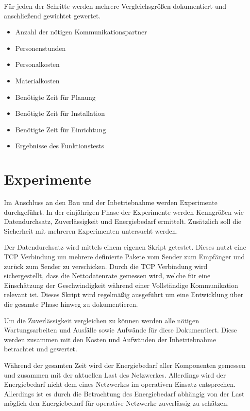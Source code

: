 Für jeden der Schritte werden mehrere Vergleichsgrößen dokumentiert und anschließend gewichtet gewertet.

\begin{itemize}
    \item Anzahl der nötigen Kommunikationspartner
    \item Personenstunden
    \item Personalkosten
    \item Materialkosten
    \item Benötigte Zeit für Planung
    \item Benötigte Zeit für Installation
    \item Benötigte Zeit für Einrichtung
    \item Ergebnisse des Funktionstests
\end{itemize}

\section{Experimente}

Im Anschluss an den Bau und der Inbetriebnahme werden Experimente durchgeführt.
In der einjährigen Phase der Experimente werden Kenngrößen wie Datendurchsatz, Zuverlässigkeit und Energiebedarf ermittelt.
Zusätzlich soll die Sicherheit mit mehreren Experimenten untersucht werden.

Der Datendurchsatz wird mittels einem eigenen Skript getestet.
Dieses nutzt eine \ac{TCP} Verbindung um mehrere definierte Pakete vom Sender zum Empfänger und zurück zum Sender zu verschicken.
Durch die \ac{TCP} Verbindung wird sichergestellt, dass die Nettodatenrate gemessen wird, welche für eine Einschätzung der Geschwindigkeit während einer Vollständige Kommunikation relevant ist.
Dieses Skript wird regelmäßig ausgeführt um eine Entwicklung über die gesamte Phase hinweg zu dokumentieren.

Um die Zuverlässigkeit vergleichen zu können werden alle nötigen Wartungsarbeiten und Ausfälle sowie Aufwände für diese Dokumentiert.
Diese werden zusammen mit den Kosten und Aufwänden der Inbetriebnahme betrachtet und gewertet.

Während der gesamten Zeit wird der Energiebedarf aller Komponenten gemessen und zusammen mit der aktuellen Last des Netzwerkes.
Allerdings wird der Energiebedarf nicht dem eines Netzwerkes im operativen Einsatz entsprechen.
Allerdings ist es durch die Betrachtung des Energiebedarf abhängig von der Last möglich den Energiebedarf für operative Netzwerke zuverlässig zu schätzen.

